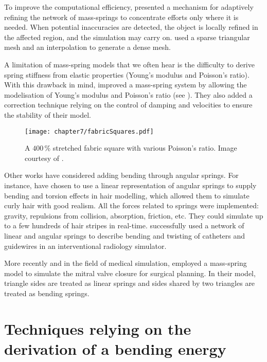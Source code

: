 To improve the computational efficiency, \cite{Hutchinson96} presented a mechanism for adaptively refining the network of mass-springs to concentrate efforts only where it is needed. When potential inaccuracies are detected, the object is locally refined in the affected region, and the simulation may carry on. \cite{Oshita01} used a sparse triangular mesh and an interpolation to generate a dense mesh. 

A limitation of mass-spring models that we often hear is the difficulty to derive spring stiffness from elastic properties (Young's modulus and Poisson's ratio). With this drawback in mind, \cite{Volino97} improved a mass-spring system by allowing the modelisation of Young's modulus and Poisson's ratio (see ). They also added a correction technique relying on the control of damping and velocities to ensure the stability of their model. 
%
\begin{figure}[ht]
\begin{center}
\texttt{[image: chapter7/fabricSquares.pdf]}
\caption[A $400\,$\% stretched fabric square]{A $400\,$\% stretched fabric square with various Poisson's ratio. Image courtesy of \cite{Volino97}.}
\label{chap7:fig-fabricSquares}
\end{center}
\end{figure}

Other works have considered adding bending through angular springs. For instance, \cite{Taskiran05} have chosen to use a linear representation of angular springs to supply bending and torsion effects in hair modelling, which allowed them to simulate curly hair with good realism. All the forces related to springs were implemented: gravity, repulsions from collision, absorption, friction, etc. They could simulate up to a few hundreds of hair stripes in real-time. \cite{Wang07} successfully used a network of linear and angular springs to describe bending and twisting of catheters and guidewires in an interventional radiology simulator. 

More recently and in the field of medical simulation, \cite{Hammer08} employed a mass-spring model to simulate the mitral valve closure for surgical planning. In their model, triangle sides are treated as linear springs and sides shared by two triangles are treated as bending springs. 

	
\section{Techniques relying on the derivation of a bending energy}

